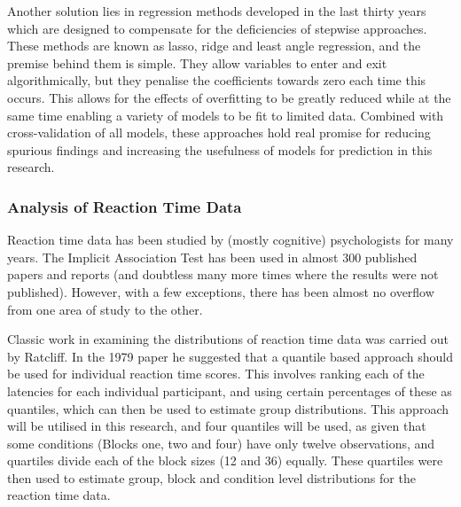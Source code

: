 Another solution lies in regression methods developed in the last thirty years which are designed to compensate for the deficiencies of stepwise approaches. These methods are known as lasso, ridge and least angle regression, and the premise behind them is simple. They allow variables to enter and exit algorithmically, but they penalise the coefficients towards zero each time this occurs\cite{friedman2009elements}. This allows for the effects of overfitting to be greatly reduced while at the same time enabling a variety of models to be fit to limited data. Combined with cross-validation of all models, these approaches hold real promise for reducing spurious findings and increasing the usefulness of models for prediction in this research.

\subsubsection{Analysis of Reaction Time Data}

Reaction time data has been studied by (mostly cognitive) psychologists for many years. The Implicit Association Test has been used in almost 300 published papers and reports (and doubtless many more times where the results were not published). However, with a few exceptions, there has been almost no overflow from one area of study to the other.

Classic work in examining the distributions of reaction time data was carried out by Ratcliff\cite{ratcliff1979group}\cite{ratcliff1993methods}. In the 1979 paper he suggested that a quantile based approach should be used for individual reaction time scores. This involves ranking each of the latencies for each individual participant, and using certain percentages of these as quantiles, which can then be used to estimate group distributions. This approach will be utilised in this research, and four quantiles will be used, as given that some conditions (Blocks one, two and four) have only twelve observations, and quartiles divide each of the block sizes (12 and 36) equally. These quartiles were then used to estimate group, block and condition level distributions for the reaction time data. 


